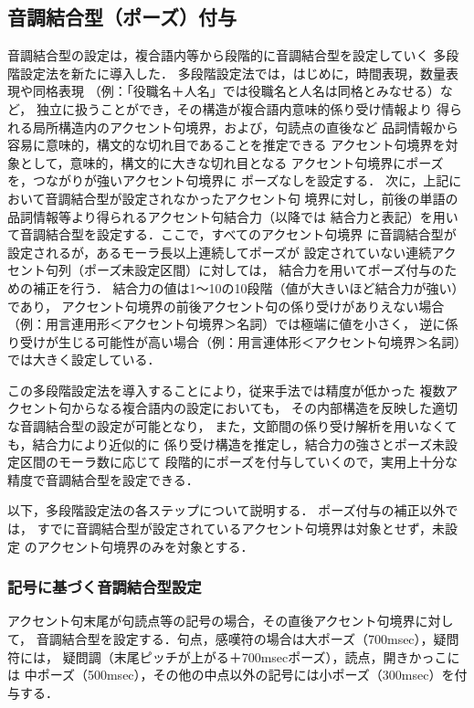 \subsection{音調結合型（ポーズ）付与}\label{subs:pause}
音調結合型の設定は，複合語内等から段階的に音調結合型を設定していく
多段階設定法を新たに導入した．
多段階設定法では，はじめに，時間表現，数量表現や同格表現
（例：「役職名＋人名」では役職名と人名は同格とみなせる）など，
独立に扱うことができ，その構造が複合語内意味的係り受け情報より
得られる局所構造内のアクセント句境界，および，句読点の直後など
品詞情報から容易に意味的，構文的な切れ目であることを推定できる
アクセント句境界を対象として，意味的，構文的に大きな切れ目となる
アクセント句境界にポーズを，つながりが強いアクセント句境界に
ポーズなしを設定する．
次に，上記において音調結合型が設定されなかったアクセント句
境界に対し，前後の単語の品詞情報等より得られるアクセント句結合力（以降では
結合力と表記）を用いて音調結合型を設定する．ここで，すべてのアクセント句境界
に音調結合型が設定されるが，あるモーラ長以上連続してポーズが
設定されていない連続アクセント句列（ポーズ未設定区間）に対しては，
結合力を用いてポーズ付与のための補正を行う．
結合力の値は1〜10の10段階（値が大きいほど結合力が強い）であり，
アクセント句境界の前後アクセント句の係り受けがありえない場合
（例：用言連用形＜アクセント句境界＞名詞）では極端に値を小さく，
逆に係り受けが生じる可能性が高い場合（例：用言連体形＜アクセント句境界＞名詞）
では大きく設定している．

この多段階設定法を導入することにより，従来手法では精度が低かった
複数アクセント句からなる複合語内の設定においても，
その内部構造を反映した適切な音調結合型の設定が可能となり，
また，文節間の係り受け解析を用いなくても，結合力により近似的に
係り受け構造を推定し，結合力の強さとポーズ未設定区間のモーラ数に応じて
段階的にポーズを付与していくので，実用上十分な精度で音調結合型を設定できる．

以下，多段階設定法の各ステップについて説明する．
ポーズ付与の補正以外では，
すでに音調結合型が設定されているアクセント句境界は対象とせず，未設定
のアクセント句境界のみを対象とする．
\subsubsection{記号に基づく音調結合型設定} \label{subsub:kigo}
アクセント句末尾が句読点等の記号の場合，その直後アクセント句境界に対して，
音調結合型を設定する．句点，感嘆符の場合は大ポーズ（700msec），疑問符には，
疑問調（末尾ピッチが上がる＋700msecポーズ），読点，開きかっこには
中ポーズ（500msec），その他の中点以外の記号には小ポーズ（300msec）を付与する．
